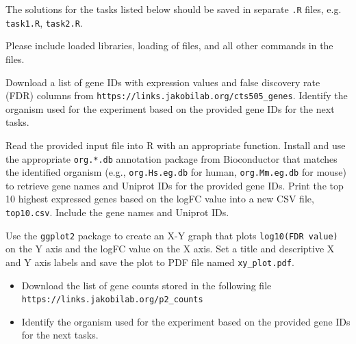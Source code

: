 \documentclass[11pt,largemargins, letter]{homework}
\begin{document}
\maketitle

The solutions for the tasks listed below should be saved in separate \texttt{.R} files, e.g. \texttt{task1.R}, \texttt{task2.R}.

Please include loaded libraries, loading of files, and all other commands in the files.

\question

 \begin{alphaparts}
   \questionpart Download a list of gene IDs with expression values and false discovery rate (FDR) columns from \texttt{https://links.jakobilab.org/cts505\_genes}.
   \questionpart Identify the organism used for the experiment based on the provided gene IDs for the next tasks.
 \end{alphaparts}

\question

 \begin{alphaparts}
   \questionpart Read the provided input file into R with an appropriate function.
   \questionpart Install and use the appropriate \texttt{org.*.db} annotation package from Bioconductor that matches the identified organism (e.g., \texttt{org.Hs.eg.db} for human, \texttt{org.Mm.eg.db} for mouse) to retrieve gene names and Uniprot IDs for the provided gene IDs.
   \questionpart Print the top 10 highest expressed genes based on the logFC value into a new CSV file, \texttt{top10.csv}.
   Include the gene names and Uniprot IDs.
 \end{alphaparts}

\question

 \begin{alphaparts}
   \questionpart Use the \texttt{ggplot2} package to create an X-Y graph that plots \texttt{log10(FDR value)} on the Y axis and the logFC value on the X axis.
   \questionpart Set a title and descriptive X and Y axis labels and save the plot to PDF file named \texttt{xy\_plot.pdf}.
 \end{alphaparts}

\pagebreak
 \question

\begin{itemize}

   \item Download the list of gene counts stored in the following file \\\texttt{https://links.jakobilab.org/p2\_counts}
   \item Identify the organism used for the experiment based on the provided gene IDs for the next tasks.
\end{itemize}
\end{document}
